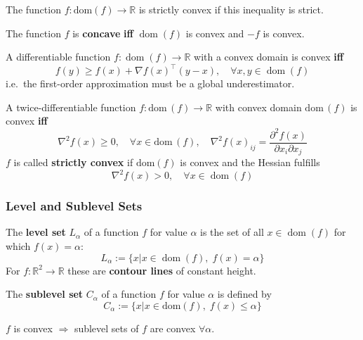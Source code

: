 \newpar{}
The function $f:\text{dom}(f) \rightarrow \mathbb{R}$ is strictly convex if this inequality is strict.

\newpar{}
The function $f$ is \textbf{concave} \textbf{iff} $\operatorname{dom}(f)$ is convex and $-f$ is convex.

\newpar{}

A differentiable function $f: \operatorname{dom}(f) \to \mathbb{R}$ with a convex domain is convex \textbf{iff}
\begin{equation*}
    f(y) \geq f(x) + \nabla {f(x)}^{\top}(y-x), \quad \forall x, y \in \operatorname{dom}(f)
\end{equation*}
i.e.\ the first-order approximation must be a global underestimator.

\newpar{}

A twice-differentiable function $f : \text{dom}\,(f) \to \mathbb{R}$ with convex domain $\text{dom}\,(f)$ is convex \textbf{iff}
\begin{equation*}
    \nabla^2 f(x) \geq 0, \quad \forall x \in \text{dom}\,(f), \quad \nabla^2 {f(x)}_{ij} = \frac{\partial^2 f(x)}{\partial x_i \partial x_j}
\end{equation*}
\newpar{}
$f$ is called \textbf{strictly convex} if $\text{dom}(f)$ is convex and the Hessian fulfills
\begin{equation*}
    \nabla^2 f(x) > 0, \quad \forall x\in \operatorname{dom}(f)
\end{equation*}

\subsubsection{Level and Sublevel Sets}
The \textbf{level set} $L_{\alpha}$ of a function $f$ for value $\alpha$ is the set of all $x \in \operatorname{dom}(f)$ for which $f(x) = \alpha$:
\begin{equation*}
    L_{\alpha} := \{ x | x \in \operatorname{dom}(f),\; f(x) = \alpha \}
\end{equation*}
\newpar{}
For $f:\mathbb{R}^2 \to \mathbb{R}$ these are \textbf{contour lines} of constant height.

The \textbf{sublevel set} $C_{\alpha}$ of a function $f$ for value $\alpha$ is defined by
\begin{equation*}
    C_{\alpha} := \{x | x \in \text{dom}(f),\; f(x) \leq \alpha\}
\end{equation*}

\newpar{}
$f$ is convex $\Rightarrow$ sublevel sets of $f$ are convex $\forall \alpha$.

